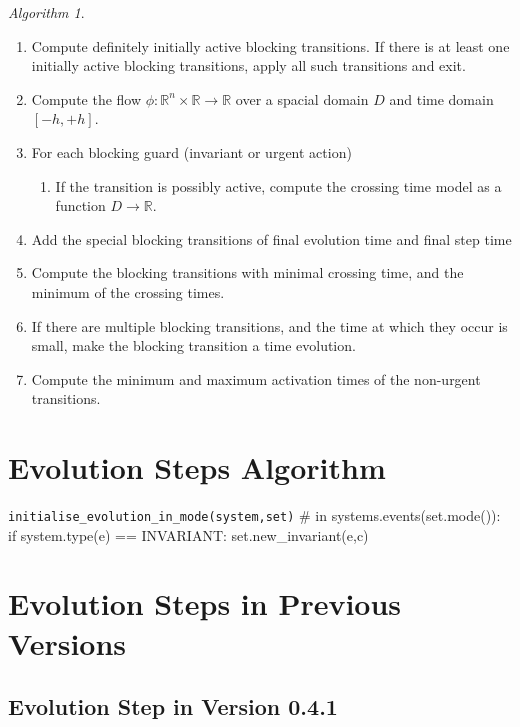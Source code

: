 \documentclass[english,a4paper]{article}
\newcommand{\R}{\mathbb{R}}
\theoremstyle{theorem}
\theoremstyle{definition}
\theoremstyle{remark}
\newtheorem*{algorithm*}{Algorithm}
\begin{document}
\begin{algorithm*}\mbox{}
 \begin{enumerate}
 \item Compute definitely initially active blocking transitions. If there is at least one initially active blocking transitions, apply all such transitions and exit.
 \item Compute the flow $\phi:\R^n\times\R\rightarrow\R$ over a spacial domain $D$ and time domain $[-h,+h]$.
 \item For each blocking guard (invariant or urgent action)
  \begin{enumerate}
   \item If the transition is possibly active, compute the crossing time model as a function $D\rightarrow\R$.
  \end{enumerate}
 \item Add the special blocking transitions of final evolution time and final step time
 \item Compute the blocking transitions with minimal crossing time, and the minimum of the crossing times.
 \item If there are multiple blocking transitions, and the time at which they occur is small, make the blocking transition a time evolution.
 \item Compute the minimum and maximum activation times of the non-urgent transitions.

\end{enumerate}
\end{algorithm*}


\section{Evolution Steps Algorithm}

\texttt{initialise\_evolution\_in\_mode(system,set)}
  # 
   in systems.events(set.mode()):
    if system.type(e) == INVARIANT:
      set.new_invariant(e,c)



\appendix

\section{Evolution Steps in Previous Versions}

\subsection*{Evolution Step in Version 0.4.1}
\end{document}
